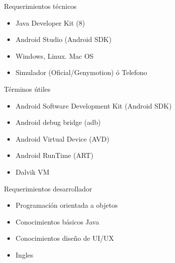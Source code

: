 \documentclass{beamer}
\begin{document}
\begin{frame}{Requerimientos técnicos}
\begin{itemize}
    \item Java Developer Kit (8)
    \item Android Studio (Android SDK)
    \item Windows, Linux. Mac OS
    \item Simulador (Oficial/Genymotion) ó Telefono
\end{itemize}
\end{frame}

\begin{frame}{Términos útiles}
\begin{itemize}
    \item Android Software Development Kit (Android SDK)
    \item Android debug bridge (adb)
    
    \item Android Virtual Device (AVD) 
    \item Android RunTime (ART)
    \item Dalvik VM
\end{itemize}
\end{frame}

\begin{frame}{Requerimientos desarrollador}
    \begin{itemize}
        \item Programación orientada a objetos
        \item Conocimientos básicos Java
        \item Conocimientos diseño de UI/UX
         \item Ingles
    \end{itemize}
\end{frame}
\end{document}
